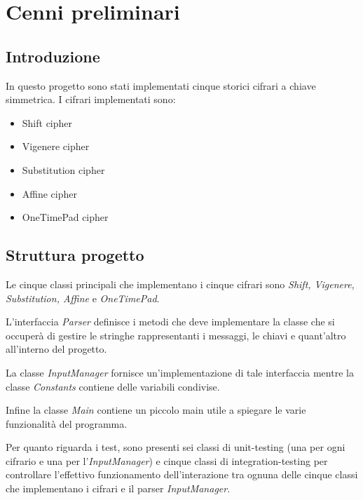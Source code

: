 \chapter{Cenni preliminari}

	\section{Introduzione}
		In questo progetto sono stati implementati cinque storici cifrari a chiave simmetrica. I cifrari implementati sono:
		\begin{itemize}
			\item Shift cipher
			\item Vigenere cipher
			\item Substitution cipher
			\item Affine cipher
			\item OneTimePad cipher
		\end{itemize}
		
	\section{Struttura progetto}
		Le cinque classi principali che implementano i cinque cifrari sono \emph{Shift, Vigenere, Substitution, Affine} e \emph{OneTimePad}.
		
		L'interfaccia \emph{Parser} definisce i metodi che deve implementare la classe che si occuperà di gestire le stringhe rappresentanti i messaggi, le chiavi e quant'altro all'interno del progetto.
		
		La classe \emph{InputManager} fornisce un'implementazione di tale interfaccia mentre la classe \emph{Constants} contiene delle variabili condivise.
		
		Infine la classe \emph{Main} contiene un piccolo main utile a spiegare le varie funzionalità del programma.
		
		Per quanto riguarda i test, sono presenti sei classi di unit-testing (una per ogni cifrario e una per l'\emph{InputManager}) e cinque classi di integration-testing per controllare l'effettivo funzionamento dell'interazione tra ognuna delle cinque classi che implementano i cifrari e il parser \emph{InputManager}.